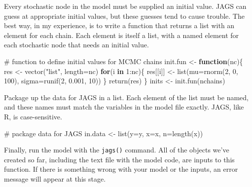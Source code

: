 \documentclass[
  13,
  letterpaper,
]{report}
\newenvironment{Shaded}{\begin{snugshade}}{\end{snugshade}}
\newcommand{\AttributeTok}[1]{\textcolor[rgb]{0.40,0.45,0.13}{#1}}
\newcommand{\CommentTok}[1]{\textcolor[rgb]{0.37,0.37,0.37}{#1}}
\newcommand{\ControlFlowTok}[1]{\textcolor[rgb]{0.00,0.23,0.31}{\textbf{#1}}}
\newcommand{\DecValTok}[1]{\textcolor[rgb]{0.68,0.00,0.00}{#1}}
\newcommand{\FloatTok}[1]{\textcolor[rgb]{0.68,0.00,0.00}{#1}}
\newcommand{\FunctionTok}[1]{\textcolor[rgb]{0.28,0.35,0.67}{#1}}
\newcommand{\NormalTok}[1]{\textcolor[rgb]{0.00,0.23,0.31}{#1}}
\newcommand{\OtherTok}[1]{\textcolor[rgb]{0.00,0.23,0.31}{#1}}
\newcommand{\SpecialCharTok}[1]{\textcolor[rgb]{0.37,0.37,0.37}{#1}}
\newcommand{\StringTok}[1]{\textcolor[rgb]{0.13,0.47,0.30}{#1}}
\begin{document}
Every stochastic node in the model must be supplied an initial value.
JAGS can guess at appropriate initial values, but these guesses tend to
cause trouble. The best way, in my experience, is to write a function
that returns a list with an element for each chain. Each element is
itself a list, with a named element for each stochastic node that needs
an initial value.

\begin{Shaded}
\begin{Highlighting}[]
\CommentTok{\# function to define initial values for MCMC chains}
\NormalTok{init.fun }\OtherTok{\textless{}{-}} \ControlFlowTok{function}\NormalTok{(nc)\{}
\NormalTok{    res }\OtherTok{\textless{}{-}} \FunctionTok{vector}\NormalTok{(}\StringTok{"list"}\NormalTok{, }\AttributeTok{length=}\NormalTok{nc)}
    \ControlFlowTok{for}\NormalTok{(i }\ControlFlowTok{in} \DecValTok{1}\SpecialCharTok{:}\NormalTok{nc)\{}
\NormalTok{        res[[i]] }\OtherTok{\textless{}{-}} \FunctionTok{list}\NormalTok{(}\AttributeTok{mu=}\FunctionTok{rnorm}\NormalTok{(}\DecValTok{2}\NormalTok{, }\DecValTok{0}\NormalTok{, }\DecValTok{100}\NormalTok{),}
                         \AttributeTok{sigma=}\FunctionTok{runif}\NormalTok{(}\DecValTok{2}\NormalTok{, }\FloatTok{0.001}\NormalTok{, }\DecValTok{10}\NormalTok{))}
\NormalTok{    \}}
    \FunctionTok{return}\NormalTok{(res)}
\NormalTok{\}}
\NormalTok{inits }\OtherTok{\textless{}{-}} \FunctionTok{init.fun}\NormalTok{(nchains)}
\end{Highlighting}
\end{Shaded}

Package up the data for JAGS in a list. Each element of the list must be
named, and these names must match the variables in the model file
exactly. JAGS, like R, is case-sensitive.

\begin{Shaded}
\begin{Highlighting}[]
\CommentTok{\# package data for JAGS}
\NormalTok{in.data }\OtherTok{\textless{}{-}} \FunctionTok{list}\NormalTok{(}\AttributeTok{y=}\NormalTok{y, }\AttributeTok{x=}\NormalTok{x, }\AttributeTok{n=}\FunctionTok{length}\NormalTok{(x))}
\end{Highlighting}
\end{Shaded}

Finally, run the model with the \texttt{jags()} command. All of the
objects we've created so far, including the text file with the model
code, are inputs to this function. If there is something wrong with your
model or the inputs, an error message will appear at this stage.
\end{document}
